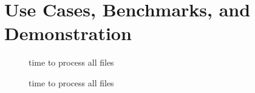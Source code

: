 \chapter{Use Cases, Benchmarks, and Demonstration}

\begin{figure}[h]
\centering

\caption{time to process all files}
\end{figure}

\begin{figure}[h]
\centering

\caption{time to process all files}
\end{figure}
